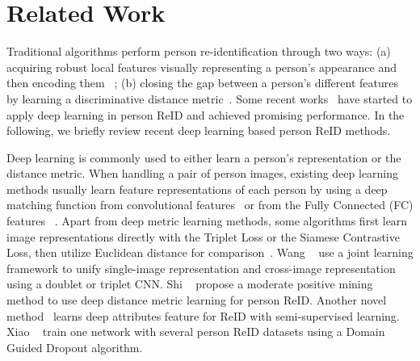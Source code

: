 \documentclass[10pt,twocolumn,letterpaper]{article}
\begin{document}
\section{Related Work}
Traditional algorithms perform person re-identification through two ways: (a) acquiring robust local features visually representing a person's appearance and then encoding them ~\cite{farenzena2010person,cheng2011custom,ma2012bicov,liu2012person,zhao2013unsupervised,wang2014person,Zheng_2015_CVPR}; (b) closing the gap between a person's different features by learning a discriminative distance metric~\cite{ma2013domain,dikmen2011pedestrian,hirzer2012relaxed,pedagadi2013local,yan2007graph,kostinger2012large,xiong2014person,liu2013pop,li2013learning,zheng2013re,wang2014personvideo,chen2015similarity,liao2015person,chen2015mirror,shen2015person,liao2015efficient,ding2015deep,pengunsupervised,zhang2016learning}. Some recent works~\cite{ahmed5improved,ding2015deep,xiao2016learning,varior2016gated,su2016deep,zheng2016mars,geng2016deep,cheng2016person,varior2016siamese,shi2016embedding,zheng2017pose,zhao2017spindle} have started to apply deep learning in person ReID and achieved promising performance. In the following, we briefly review recent deep learning based person ReID methods.

Deep learning is commonly used to either learn a person's representation or the distance metric. When handling a pair of person images, existing deep learning methods usually learn feature representations of each person by using a deep matching function from convolutional features~\cite{ahmed5improved,li2014deepreid,xiao2016learning,geng2016deep} or from the Fully Connected (FC) features ~\cite{yi2014deep,shi2016embedding,zheng2016mars}. Apart from deep metric learning methods, some algorithms first learn image representations directly with the Triplet Loss or the Siamese Contrastive Loss, then utilize Euclidean distance for comparison~\cite{wangjoint,cheng2016person,ding2015deep,varior2016gated}. Wang \etal~\cite{wangjoint} use a joint learning framework to unify single-image representation and cross-image representation using a doublet or triplet CNN. Shi \etal~\cite{shi2016embedding} propose a moderate positive mining method to use
deep distance metric learning for person ReID. Another novel method~\cite{shi2016embedding} learns deep attributes feature for ReID with semi-supervised learning. Xiao \etal~\cite{xiao2016learning} train one network with several person ReID datasets using a Domain Guided Dropout algorithm.
\end{document}
